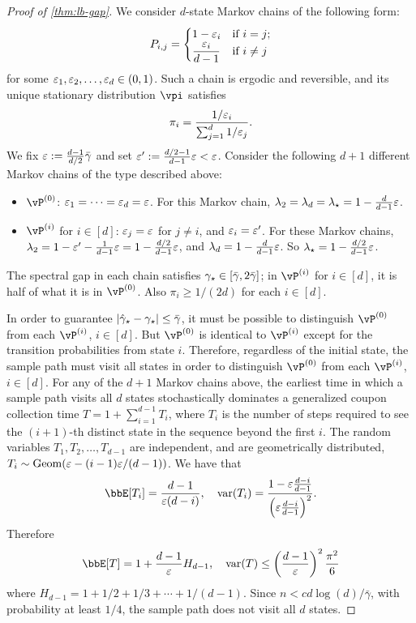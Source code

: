 \begin{proof}[Proof of \cref{thm:lb-gap}]
  We consider $d$-state Markov chains of the following form:
  \[
    P_{i,j} =
    \begin{cases}
      1-\varepsilon_i & \text{if $i = j$} ; \\
      \displaystyle\frac{\varepsilon_i}{d-1} & \text{if $i \neq j$}
    \end{cases}
  \]
  for some $\varepsilon_1, \varepsilon_2, \dotsc, \varepsilon_d \in (0,1)$.
  Such a chain is ergodic and reversible, and its unique stationary
  distribution $\vpi$ satisfies
  \[
    \pi_i = \frac{1/\varepsilon_i}{\sum_{j=1}^d 1/\varepsilon_j}
    .
  \]
  We fix $\varepsilon := \frac{d-1}{d/2}\bar\gamma$ and set $\varepsilon' :=
  \frac{d/2-1}{d-1} \varepsilon < \varepsilon$.
  Consider the following $d+1$ different Markov chains of the type
  described above:
  \begin{itemize}
    \item
      $\vP^{(0)}$: $\varepsilon_1 = \dotsb = \varepsilon_d = \varepsilon$.
      For this Markov chain, $\lambda_2 = \lambda_d = \lambda_{\star} =
      1-\frac{d}{d-1}\varepsilon$.

    \item
      $\vP^{(i)}$ for $i \in [d]$: $\varepsilon_j = \varepsilon$ for $j \neq i$,
      and $\varepsilon_i = \varepsilon'$.
      For these Markov chains, $\lambda_2 = 1 - \varepsilon' -
      \frac{1}{d-1}\varepsilon = 1 - \frac{d/2}{d-1} \varepsilon$,
      and $\lambda_d = 1 - \frac{d}{d-1} \varepsilon$.
      So $\lambda_{\star} = 1-\frac{d/2}{d-1} \varepsilon$.

  \end{itemize}
  The spectral gap in each chain satisfies $\gamma_{\star} \in
  [\bar\gamma,2\bar\gamma]$; in $\vP^{(i)}$ for $i \in [d]$, it is half
  of what it is in $\vP^{(0)}$.
  Also $\pi_i \geq 1/(2d)$ for each $i \in [d]$.

  In order to guarantee $|\hat\gamma_{\star} - \gamma_{\star}| \leq \bar\gamma$, it must
  be possible to distinguish $\vP^{(0)}$ from each $\vP^{(i)}$,
  $i\in[d]$.
  But $\vP^{(0)}$ is identical to $\vP^{(i)}$ except for the transition
  probabilities from state $i$.
  Therefore, regardless of the initial state, the sample path must
  visit all states in order to distinguish $\vP^{(0)}$ from each
  $\vP^{(i)}$, $i \in [d]$.
  For any of the $d+1$ Markov chains above, the earliest time in which
  a sample path visits all $d$ states
  stochastically dominates a generalized coupon collection time $T = 1 +
  \sum_{i=1}^{d-1} T_i$, where $T_i$ is the number of steps required to
  see the $(i+1)$-th distinct state in the sequence beyond the first
  $i$.
  The random variables $T_1,T_2,\dotsc,T_{d-1}$ are independent, and are
  geometrically distributed, $T_i \sim \operatorname{Geom}(\varepsilon -
  (i-1)\varepsilon/(d-1))$.
  We have that
  \[
    \bbE[T_i] = \frac{d-1}{\veps(d-i)} , \quad
    \var(T_i) = \frac{1 - \veps \frac{d-i}{d-1}}{%
      \Parens{ \veps \frac{d-i}{d-1} }^2
    }
    .
  \]
  Therefore
  \[
    \bbE[T] = 1 + \frac{d-1}{\veps} H_{d-1} , \quad
    \var(T) \leq \Parens{ \frac{d-1}{\veps} }^2 \frac{\pi^2}{6} 
  \]
  where $H_{d-1} = 1 + 1/2 + 1/3 + \dotsb + 1/(d-1)$.
  Since $n < c d\log(d) / \bar\gamma$, with probability at least $1/4$,
  the sample path does not visit all $d$ states.
\end{proof}


